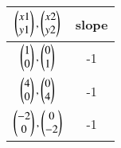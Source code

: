 \begin{tabular}[12pt]{ |c| c|}
    \hline
	$\myvec{x1\\y1},\myvec{x2\\y2}$	& slope \\ 
    \hline
	$\myvec{1\\0},\myvec{0\\1}$  & -1\\
    \hline 
	$\myvec{4\\0},\myvec{0\\4}$ &  -1 \\
    \hline
	$\myvec{-2\\0},\myvec{0\\-2}$ &  -1\\
    \hline   
    \end{tabular}
